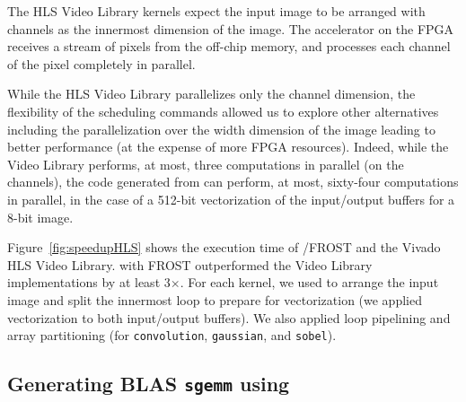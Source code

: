 The HLS Video Library kernels expect the input image to be arranged with channels as the innermost dimension of the image. 
The accelerator on the FPGA receives a stream of pixels from the off-chip memory, and processes each channel of the pixel completely in parallel.

While the HLS Video Library parallelizes only the channel dimension, the flexibility of the \framework{} scheduling commands allowed us to explore other alternatives including the parallelization over the width dimension of the image leading to better performance (at the expense of more FPGA resources).
Indeed, while the Video Library performs, at most, three computations in parallel (on the channels), the code generated from \framework{} can perform, at most, sixty-four computations in parallel, in the case of a 512-bit vectorization of the input/output buffers for a 8-bit image.

Figure~\ref{fig:speedupHLS} shows the execution time of \framework{}/FROST and the Vivado HLS Video Library.
\framework{} with FROST outperformed the Video Library implementations by at least 3$\times$.
For each kernel, we used \framework{} to arrange the input image and split the innermost loop to prepare for vectorization (we applied vectorization to both input/output buffers). We also applied loop pipelining and array partitioning (for \texttt{convolution}, \texttt{gaussian}, and \texttt{sobel}).



\subsection{Generating BLAS \texttt{sgemm} using \framework}

